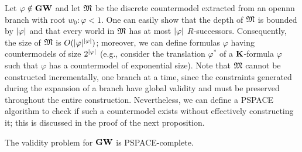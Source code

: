 \noindent
Let $\varphi \notin \mathbf{GW}$ and let $\mathfrak{M}$ be the discrete countermodel
extracted from an opennn branch with root $w_0:\varphi < 1$. One can
easily show that the depth of $\mathfrak{M}$ is bounded by $|\varphi|$ and
that every world in $\mathfrak{M}$ has at most $|\varphi|$ $R$-successors.
Consequently, the size of $\mathfrak{M}$ is
$O(|\varphi|^{|\varphi|})$; moreover, we can define formulas
$\varphi$ having countermodels of size $2^{|\varphi|}$ (e.g.,
consider the translation $\varphi^*$ of a $\mathbf{K}$-formula $\varphi$ such
that $\varphi$ has a countermodel of exponential size).  Note that
$\mathfrak{M}$ cannot be constructed incrementally, one branch at a time, since
the constraints generated during the expansion of a branch have global
validity and must be preserved throughout the entire construction.
Nevertheless, we can define a PSPACE algorithm to check if such a
countermodel exists without effectively constructing it; this is
discussed in the proof of the next proposition.

\begin{proposition}
The validity problem for $\mathbf{GW}$ is PSPACE-complete.  
\end{proposition}

